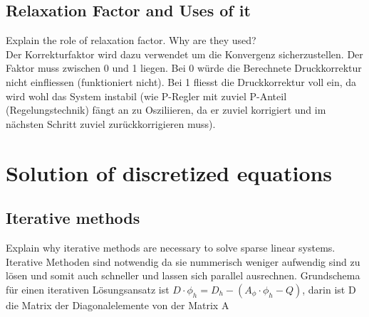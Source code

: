 \documentclass[a4paper]{scrartcl}
\begin{document}
\subsection{Relaxation Factor and Uses of it}
Explain the role of relaxation factor. Why are they used?\\

Der Korrekturfaktor wird dazu verwendet um die Konvergenz sicherzustellen. Der
Faktor muss zwischen 0 und 1 liegen. Bei 0 würde die Berechnete Druckkorrektur
nicht einfliessen (funktioniert nicht). Bei 1 fliesst die Druckkorrektur voll
ein, da wird wohl das System instabil (wie P-Regler mit zuviel P-Anteil
(Regelungstechnik) fängt an zu Osziliieren, da er zuviel korrigiert und im
nächsten Schritt zuviel zurückkorrigieren muss).

\section{Solution of discretized equations}

\subsection{Iterative methods} 
Explain why iterative methods are necessary to solve sparse linear systems.\\

Iterative Methoden sind notwendig da sie nummerisch weniger aufwendig sind zu
lösen und somit auch schneller und lassen sich parallel ausrechnen. Grundschema
für einen iterativen Lösungsansatz ist $ D \cdot \phi_h = D_h - (A_\phi \cdot
\phi_h - Q)$, darin ist D die Matrix der Diagonalelemente von der Matrix A
\end{document}
